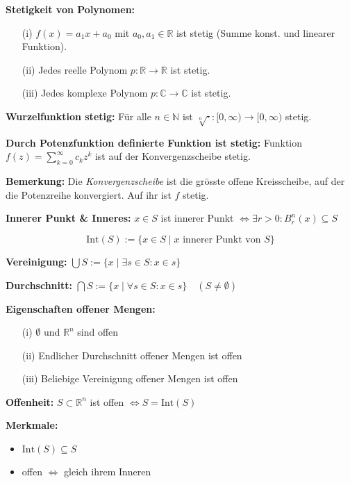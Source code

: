 \begin{itemize}
\textbf{Stetigkeit von Polynomen:}
\begin{itemize}
  \item[(i)] \(f(x) = a_1 x + a_0\) mit \(a_0,a_1 \in \mathbb{R}\) ist stetig (Summe konst. und linearer Funktion).
  \item[(ii)] Jedes reelle Polynom \(p: \mathbb{R} \to \mathbb{R}\) ist stetig.
  \item[(iii)] Jedes komplexe Polynom \(p: \mathbb{C} \to \mathbb{C}\) ist stetig.
\end{itemize}

\textbf{Wurzelfunktion stetig:}  
Für alle \(n \in \mathbb{N}\) ist \(\sqrt[n]{\cdot} : [0,\infty) \to [0,\infty)\) stetig.

\textbf{Durch Potenzfunktion definierte Funktion ist stetig:}  
Funktion \(f(z) = \sum_{k=0}^\infty c_k z^k\) ist auf der Konvergenzscheibe stetig.

\textbf{Bemerkung:}  
Die \textit{Konvergenzscheibe} ist die grösste offene Kreisscheibe, auf der die Potenzreihe konvergiert. Auf ihr ist \(f\) stetig.

\textbf{Innerer Punkt \& Inneres:}  
\(x \in S\) ist innerer Punkt \(\Leftrightarrow \exists r>0: B_r^n(x) \subseteq S\)

\[
\text{Int}(S) := \{x \in S \mid x \text{ innerer Punkt von } S\}
\]

\textbf{Vereinigung:} \(\displaystyle \bigcup S := \{x \mid \exists s \in S: x \in s\}\)

\textbf{Durchschnitt:} \(\displaystyle \bigcap S := \{x \mid \forall s \in S: x \in s\}\quad (S \ne \emptyset)\)


\textbf{Eigenschaften offener Mengen:}
\begin{itemize}
  \item[(i)] \(\emptyset\) und \(\mathbb{R}^n\) sind offen
  \item[(ii)] Endlicher Durchschnitt offener Mengen ist offen
  \item[(iii)] Beliebige Vereinigung offener Mengen ist offen
\end{itemize}


\textbf{Offenheit:}  
\(S \subset \mathbb{R}^n\) ist offen \(\Leftrightarrow S = \text{Int}(S)\)

\textbf{Merkmale:}
\begin{itemize}
  \item \(\text{Int}(S) \subseteq S\)
  \item offen \(\Leftrightarrow\) gleich ihrem Inneren
\end{itemize}


\end{itemize}
